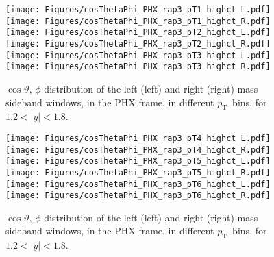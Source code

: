 \documentclass[12pt]{article}
\newcommand{\pt}{$p_{\mathrm{T}}$}
\begin{document}
\begin{figure}[htbp]
\centering
\texttt{[image: Figures/cosThetaPhi\_PHX\_rap3\_pT1\_highct\_L.pdf]}
\texttt{[image: Figures/cosThetaPhi\_PHX\_rap3\_pT1\_highct\_R.pdf]}
\texttt{[image: Figures/cosThetaPhi\_PHX\_rap3\_pT2\_highct\_L.pdf]}
\texttt{[image: Figures/cosThetaPhi\_PHX\_rap3\_pT2\_highct\_R.pdf]}
\texttt{[image: Figures/cosThetaPhi\_PHX\_rap3\_pT3\_highct\_L.pdf]}
\texttt{[image: Figures/cosThetaPhi\_PHX\_rap3\_pT3\_highct\_R.pdf]}
\caption{$\cos\vartheta,\,\phi$ distribution of the left (left) and
  right (right) mass sideband windows, in the PHX frame, in different
  \pt\ bins, for $1.2 < |y| < 1.8$.}
\end{figure}
\clearpage

\begin{figure}[htbp]
\centering
\texttt{[image: Figures/cosThetaPhi\_PHX\_rap3\_pT4\_highct\_L.pdf]}
\texttt{[image: Figures/cosThetaPhi\_PHX\_rap3\_pT4\_highct\_R.pdf]}
\texttt{[image: Figures/cosThetaPhi\_PHX\_rap3\_pT5\_highct\_L.pdf]}
\texttt{[image: Figures/cosThetaPhi\_PHX\_rap3\_pT5\_highct\_R.pdf]}
\texttt{[image: Figures/cosThetaPhi\_PHX\_rap3\_pT6\_highct\_L.pdf]}
\texttt{[image: Figures/cosThetaPhi\_PHX\_rap3\_pT6\_highct\_R.pdf]}
\caption{$\cos\vartheta,\,\phi$ distribution of the left (left) and
  right (right) mass sideband windows, in the PHX frame, in different
  \pt\ bins, for $1.2 < |y| < 1.8$.} 
\end{figure}
\clearpage
\end{document}
